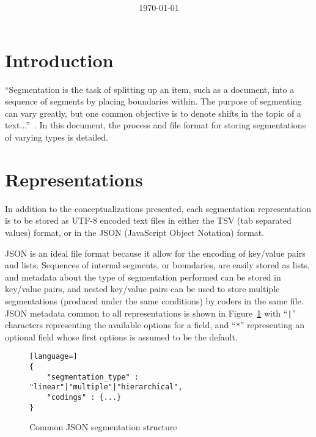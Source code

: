 \documentclass{article}
\begin{document}
\title{\pdftitle
\\
{\large \pdfversion}}
\author{\pdfauthors}
\date{\today}
\maketitle



\section{Introduction}
``Segmentation is the task of splitting up an item, such as a document,
into a sequence of segments by placing boundaries within. The purpose of
segmenting can vary greatly, but one common objective is to denote shifts in the
topic of a text...''~\citep{FournierInkpen2012}.  In this document, the process
and file format for storing segmentations of varying types is detailed.



\section{Representations}
In addition to the conceptualizations presented, each segmentation
representation is to be stored  as UTF-8 encoded text files in either the TSV
(tab separated values) format, or in the JSON (JavaScript Object Notation)
format.  

JSON is an ideal file format because it allow for the encoding of key/value
pairs and lists.  Sequences of internal segments, or boundaries, are easily
stored as lists, and metadata about the type of segmentation performed can be
stored in key/value pairs, and nested key/value pairs can be used to store
multiple segmentations (produced under the same conditions) by coders in the
same file.  JSON metadata common to all representations is shown in
Figure~\ref{fig:json} with ``\verb+|+'' characters representing the available
options for a field, and ``\verb+*+'' representing an optional field whose
first options is assumed to be the default.

\begin{figure}[h]
\begin{lstlisting}[language=]
{
	"segmentation_type" : "linear"|"multiple"|"hierarchical",
	"codings" : {...}
}
\end{lstlisting}
\vspace{-3em}
\caption{Common JSON segmentation structure}
\label{fig:json}
\end{figure}
\end{document}
